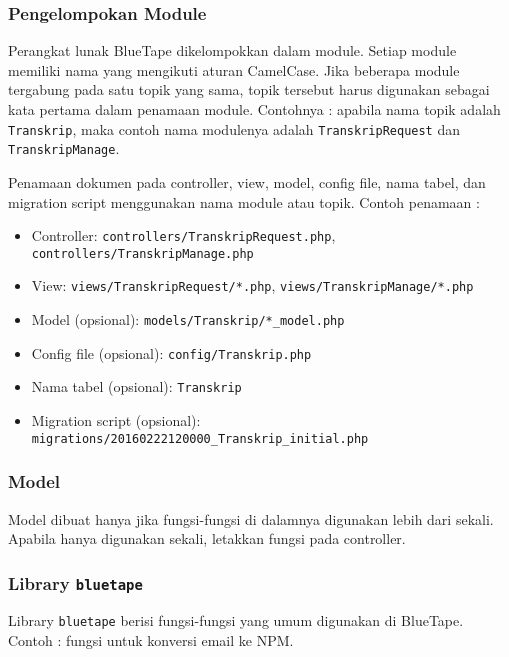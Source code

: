 	\subsubsection{Pengelompokan Module}
		Perangkat lunak BlueTape dikelompokkan dalam module. Setiap module memiliki nama yang mengikuti aturan CamelCase. Jika beberapa module tergabung pada satu topik yang sama, topik tersebut harus digunakan sebagai kata pertama dalam penamaan module. Contohnya : apabila nama topik adalah \texttt{Transkrip}, maka contoh nama modulenya adalah \texttt{TranskripRequest} dan \texttt{TranskripManage}.
		
		Penamaan dokumen pada controller, view, model, config file, nama tabel, dan migration script menggunakan nama module atau topik. Contoh penamaan :
		\begin{itemize}
			\item Controller: \texttt{controllers/TranskripRequest.php}, \texttt{controllers/TranskripManage.php}
			\item View: \texttt{views/TranskripRequest/*.php}, \texttt{views/TranskripManage/*.php}
			\item Model (opsional): \texttt{models/Transkrip/*\_model.php}
			\item Config file (opsional): \texttt{config/Transkrip.php}
			\item Nama tabel (opsional): \texttt{Transkrip}
			\item Migration script (opsional): \texttt{migrations/20160222120000\_Transkrip\_initial.php}
		\end{itemize} 
	
	\subsubsection{Model}
		Model dibuat hanya jika fungsi-fungsi di dalamnya digunakan lebih dari sekali. Apabila hanya digunakan sekali, letakkan fungsi pada controller.
	
	\subsubsection{Library \texttt{bluetape}}
		Library \texttt{bluetape} berisi fungsi-fungsi yang umum digunakan di BlueTape. Contoh : fungsi untuk konversi email ke NPM.
	
